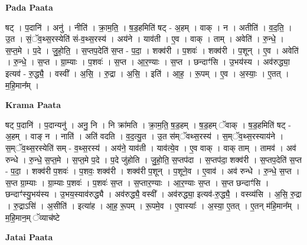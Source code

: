 \documentclass[17pt]{extarticle}
\begin{document}
\textbf{Pada Paata} \newline

षट् । प॒दानि॑ । अनु॑ । नीति॑ । क्रा॒म॒ति॒ । ष॒ड॒हमिति॑ षट् - अ॒हम् । वाक् । न । अतीति॑ । व॒द॒ति॒ । उ॒त । सं॒ॅव॒थ्स॒रस्येति॑ सं-व॒थ्स॒रस्य॑ । अय॑ने । याव॑ती । ए॒व । वाक् । ताम् । अवेति॑ । रु॒न्धे॒ । स॒प्त॒मे । प॒दे । जु॒हो॒ति॒ । स॒प्तप॒देति॑ स॒प्त - प॒दा॒ । शक्व॑री । प॒शवः॑ । शक्व॑री । प॒शून् । ए॒व । अवेति॑ । रु॒न्धे॒ । स॒प्त । ग्रा॒म्याः । प॒शवः॑ । स॒प्त । आ॒र॒ण्याः । स॒प्त । छन्दाꣳ॑सि । उ॒भय॑स्य । अव॑रुद्ध्या॒ इत्यव॑ - रु॒द्ध्यै॒ । वस्वी᳚ । अ॒सि॒ । रु॒द्रा । अ॒सि॒ । इति॑ । आ॒ह॒ । रू॒पम् । ए॒व । अ॒स्याः॒ । ए॒तत् । म॒हि॒मान᳚म् ।  \newline


\textbf{Krama Paata} \newline

षट् प॒दानि॑ । प॒दान्यनु॑ । अनु॒ नि । नि क्रा॑मति । क्रा॒म॒ति॒ ष॒ड॒हम् । ष॒ड॒हम् ॅवाक् । ष॒ड॒हमिति॑ षट् - अ॒हम् । वाङ्‍ न । नाति॑ । अति॑ वदति । व॒द॒त्यु॒त । उ॒त स॑म्ॅवथ्स॒रस्य॑ । स॒म्ॅव॒थ्स॒रस्याय॑ने । स॒म्ॅव॒थ्स॒रस्येति॑ सम् - व॒थ्स॒रस्य॑ । अय॑ने॒ याव॑ती । याव॑त्ये॒व । ए॒व वाक् । वाक् ताम् । तामव॑ । अव॑ रुन्धे । रु॒न्धे॒ स॒प्त॒मे । स॒प्त॒मे प॒दे । प॒दे जु॑होति । जु॒हो॒ति॒ स॒प्तप॑दा । स॒प्तप॑दा॒ शक्व॑री । स॒प्तप॒देति॑ स॒प्त - प॒दा॒ । शक्व॑री प॒शवः॑ । प॒शवः॒ शक्व॑री । शक्व॑री प॒शून् । प॒शूने॒व । ए॒वाव॑ । अव॑ रुन्धे । रु॒न्धे॒ स॒प्त । स॒प्त ग्रा॒म्याः । ग्रा॒म्याः प॒शवः॑ । प॒शवः॑ स॒प्त । स॒प्तार॒ण्याः । आ॒र॒ण्याः स॒प्त । स॒प्त छन्दाꣳ॑सि । छन्दाꣳ॑स्यु॒भय॑स्य । उ॒भय॒स्याव॑रुद्ध्यै । अव॑रुद्ध्यै॒ वस्वी᳚ । अव॑रुद्ध्या॒ इत्यव॑-रु॒द्ध्यै॒ । वस्व्य॑सि । अ॒सि॒ रु॒द्रा । रु॒द्राऽसि॑ । अ॒सीति॑ । इत्या॑ह । आ॒ह॒ रू॒पम् । रू॒पमे॒व । ए॒वास्याः᳚ । अ॒स्या॒ ए॒तत् । ए॒तन् म॑हि॒मान᳚म् । म॒हि॒मान॒म् ॅव्याच॑ष्टे \newline

\textbf{Jatai Paata} \newline
\end{document}
